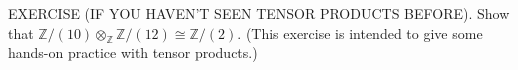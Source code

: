 EXERCISE (IF YOU HAVEN'T SEEN TENSOR PRODUCTS BEFORE). Show that $\mathbb{Z}/(10)\otimes_{\mathbb{Z}}\mathbb{Z}/(12)\cong\mathbb{Z}/(2)$. (This exercise is intended to give some hands-on practice with tensor products.)
